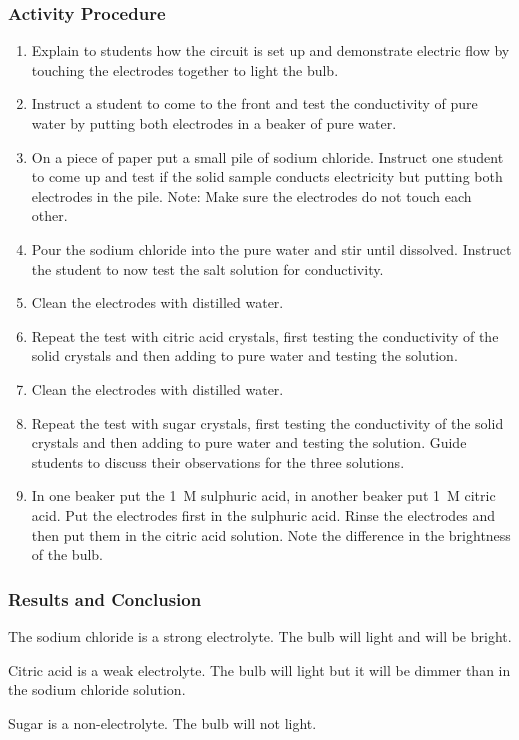 \subsubsection*{Activity Procedure}
\begin{enumerate}
\item{Explain to students how the circuit is set up and demonstrate electric flow by touching the electrodes together to light the bulb.}
\item{Instruct a student to come to the front and test the conductivity of pure water by putting both electrodes in a beaker of pure water.}
\item{On a piece of paper put a small pile of sodium chloride. Instruct one student to come up and test if the solid sample conducts electricity but putting both electrodes in the pile. Note: Make sure the electrodes do not touch each other.}
\item{Pour the sodium chloride into the pure water and stir until dissolved. Instruct the student to now test the salt solution for conductivity.}
\item{Clean the electrodes with distilled water.}
\item{Repeat the test with citric acid crystals, first testing the conductivity of the solid crystals and then adding to pure water and testing the solution.}
\item{Clean the electrodes with distilled water.}
\item{Repeat the test with sugar crystals, first testing the conductivity of the solid crystals and then adding to pure water and testing the solution. Guide students to discuss their observations for the three solutions.}
\item{In one beaker put the 1~M sulphuric acid, in another beaker put 1~M citric acid. Put the electrodes first in the sulphuric acid. Rinse the electrodes and then put them in the citric acid solution. Note the difference in the brightness of the bulb.}
\end{enumerate}

\subsubsection*{Results and Conclusion}
The sodium chloride is a strong electrolyte. The bulb will light and will be bright.

Citric acid is a weak electrolyte. The bulb will light but it will be dimmer than in the sodium chloride solution.

Sugar is a non-electrolyte. The bulb will not light.

